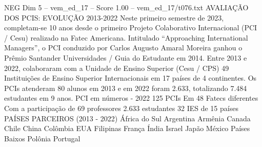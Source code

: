 \begin{textsample}{NEG Dim 5 – vem\_ed\_17 – Score 1.00 – vem\_ed\_17/t076.txt}  \label{ex:f5_neg_032}
AVALIAÇÃO DOS PCIS: EVOLUÇÃO 2013-2022 Neste primeiro semestre de 2023, completam-se 10 anos desde o primeiro Projeto Colaborativo Internacional (PCI / Cesu) realizado na Fatec Americana.
Intitulado “Approaching International Managers”, o PCI conduzido por Carlos Augusto Amaral Moreira ganhou o Prêmio Santander Universidades / Guia do Estudante em 2014.
Entre 2013 e 2022, colaboraram com a Unidade de Ensino Superior (Cesu / CPS) 49 Instituições de Ensino Superior Internacionais em 17 países de 4 continentes.
Os PCIs atenderam 80 alunos em 2013 e em 2022 foram 2.633, totalizando 7.484 estudantes em 9 anos.
PCI em números - 2022 125 PCIs Em 48 Fatecs diferentes Com a participação de 69 professores 2.633 estudantes 32 IES de 15 países PAÍSES PARCEIROS (2013 - 2022) África do Sul Argentina Armênia Canada Chile China Colômbia EUA Filipinas França Índia Israel Japão México Países Baixos Polônia Portugal

\end{textsample}
